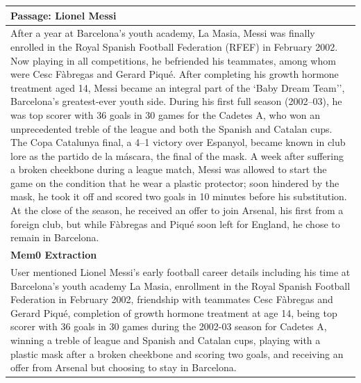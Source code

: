 \documentclass{article} %
\begin{document}
\begin{longtable}{p{\dimexpr\textwidth-2\tabcolsep}}
\textbf{Passage: Lionel Messi} \\
\midrule
After a year at Barcelona's youth academy, La Masia, Messi was finally enrolled in the Royal Spanish Football Federation (RFEF) in February 2002. Now playing in all competitions, he befriended his teammates, among whom were Cesc Fàbregas and Gerard Piqué. After completing his growth hormone treatment aged 14, Messi became an integral part of the `Baby Dream Team'', Barcelona's greatest-ever youth side. During his first full season (2002--03), he was top scorer with 36 goals in 30 games for the Cadetes A, who won an unprecedented treble of the league and both the Spanish and Catalan cups. The Copa Catalunya final, a 4--1 victory over Espanyol, became known in club lore as the partido de la máscara, the final of the mask. A week after suffering a broken cheekbone during a league match, Messi was allowed to start the game on the condition that he wear a plastic protector; soon hindered by the mask, he took it off and scored two goals in 10 minutes before his substitution. At the close of the season, he received an offer to join Arsenal, his first from a foreign club, but while Fàbregas and Piqué soon left for England, he chose to remain in Barcelona. \\ \midrule
\textbf{Mem0 Extraction} \\
\midrule
User mentioned Lionel Messi's early football career details including his time at Barcelona's youth academy La Masia, enrollment in the Royal Spanish Football Federation in February 2002, friendship with teammates Cesc Fàbregas and Gerard Piqué, completion of growth hormone treatment at age 14, being top scorer with 36 goals in 30 games during the 2002-03 season for Cadetes A, winning a treble of league and Spanish and Catalan cups, playing with a plastic mask after a broken cheekbone and scoring two goals, and receiving an offer from Arsenal but choosing to stay in Barcelona. \\

\midrule


\end{longtable}
\end{document}
